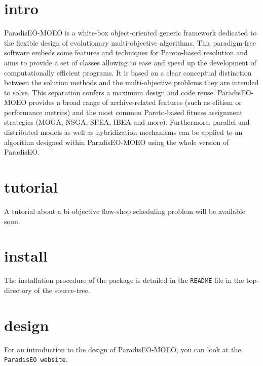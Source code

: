 \section{intro}\label{main_intro}
Paradis\-EO-MOEO is a white-box object-oriented generic framework dedicated to the flexible design of evolutionary multi-objective algorithms. This paradigm-free software embeds some features and techniques for Pareto-based resolution and aims to provide a set of classes allowing to ease and speed up the development of computationally efficient programs. It is based on a clear conceptual distinction between the solution methods and the multi-objective problems they are intended to solve. This separation confers a maximum design and code reuse. Paradis\-EO-MOEO provides a broad range of archive-related features (such as elitism or performance metrics) and the most common Pareto-based fitness assignment strategies (MOGA, NSGA, SPEA, IBEA and more). Furthermore, parallel and distributed models as well as hybridization mechanisms can be applied to an algorithm designed within Paradis\-EO-MOEO using the whole version of Paradis\-EO.\section{tutorial}\label{main_tutorial}
A tutorial about a bi-objective flow-shop scheduling problem will be available soon.\section{install}\label{main_install}
The installation procedure of the package is detailed in the {\tt README} file in the top-directory of the source-tree.\section{design}\label{main_design}
For an introduction to the design of Paradis\-EO-MOEO, you can look at the {\tt Paradis\-EO website}. 